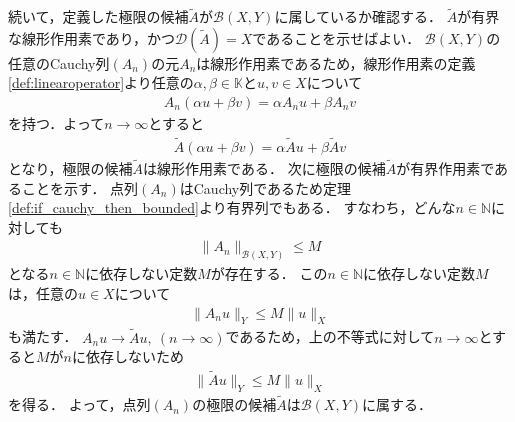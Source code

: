 \begin{Proof}
続いて，定義した極限の候補$\tilde{A}$が${\mathcal B}(X, Y)$に属しているか確認する．
$\tilde{A}$が有界な線形作用素であり，かつ${\mathcal D}(\tilde{A}) = X$であることを示せばよい．
${\mathcal B}(X, Y)$の任意のCauchy列$( A_n )$の元$A_n$は線形作用素であるため，線形作用素の定義\ref{def:linearoperator}より任意の$\alpha, \beta \in {\mathbb K}$と$u, v \in X$について
\begin{align*}
A_n (\alpha u + \beta v) = \alpha A_n u + \beta A_n v
\end{align*}
を持つ．よって$n \rightarrow \infty$とすると
\begin{align*}
\tilde{A} (\alpha u + \beta v) = \alpha \tilde{A} u + \beta \tilde{A} v
\end{align*}
となり，極限の候補$\tilde{A}$は線形作用素である．
次に極限の候補$\tilde{A}$が有界作用素であることを示す．
点列$( A_n )$はCauchy列であるため定理\ref{def:if_cauchy_then_bounded}より有界列でもある．
すなわち，どんな$n \in {\mathbb N}$に対しても
\begin{align*}
\| A_n \|_{{\mathcal B}(X,Y)} \le M
\end{align*}
となる$n \in {\mathbb N}$に依存しない定数$M$が存在する．
この$n \in {\mathbb N}$に依存しない定数$M$は，任意の$u \in X$について
\begin{align*}
\| A_n u \|_{Y} \le M \| u \|_{X}
\end{align*}
も満たす．
$A_n u \rightarrow \tilde{A} u, ~ (n \rightarrow \infty)$であるため，上の不等式に対して$n \rightarrow \infty$とすると$M$が$n$に依存しないため
\begin{align*}
\| \tilde{A} u \|_{Y} \le M \| u \|_{X}
\end{align*}
を得る．
よって，点列$(A_n)$の極限の候補$\tilde{A}$は${\mathcal B}(X, Y)$に属する．


\end{Proof}
